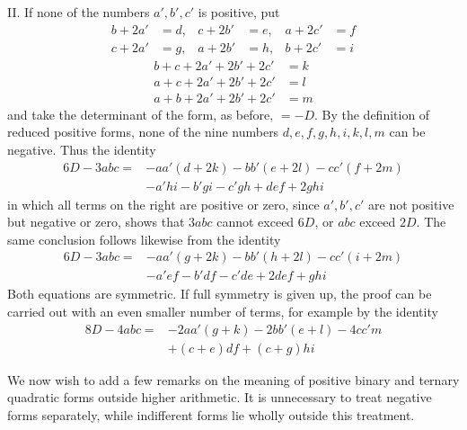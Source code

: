 II. If none of the numbers $a',b',c'$ is positive, put
\[
\begin{aligned}
b+2a'&=d,&c+2b'&=e,&a+2c'&=f\\
c+2a'&=g,&a+2b'&=h,&b+2c'&=i
\end{aligned}
\]
\[
\begin{aligned}
b+c+2a'+2b'+2c'&=k\\
a+c+2a'+2b'+2c'&=l\\
a+b+2a'+2b'+2c'&=m
\end{aligned}
\]
and take the determinant of the form, as before, $=-D$. By the definition of reduced positive forms, none of the nine numbers $d,\allowbreak e,\allowbreak f,\allowbreak g,\allowbreak h,\allowbreak i,\allowbreak k,\allowbreak l,\allowbreak m$ can be negative. Thus the identity
\[
\begin{aligned}
6D-3abc={}&-aa'(d+2k)-bb'(e+2l)-cc'(f+2m)\\
&-a'hi-b'gi-c'gh+def+2ghi
\end{aligned}
\]
in which all terms on the right are positive or zero, since $a',b',c'$ are not positive but negative or zero, shows that $3abc$ cannot exceed $6D$, or $abc$ exceed $2D$. The same conclusion follows likewise from the identity
\[
\begin{aligned}
6D-3abc={}&-aa'(g+2k)-bb'(h+2l)-cc'(i+2m)\\
&-a'ef-b'df-c'de+2def+ghi
\end{aligned}
\]
Both equations are symmetric. If full symmetry is given up, the proof can be carried out with an even smaller number of terms, for example by the identity
\[
\begin{aligned}
8D-4abc={}&-2aa'(g+k)-2bb'(e+l)-4cc'm\\
&+(c+e)df+(c+g)hi
\end{aligned}
\]

We now wish to add a few remarks on the meaning of positive binary and ternary quadratic forms outside higher arithmetic. It is unnecessary to treat negative forms separately, while indifferent forms lie wholly outside this treatment.

